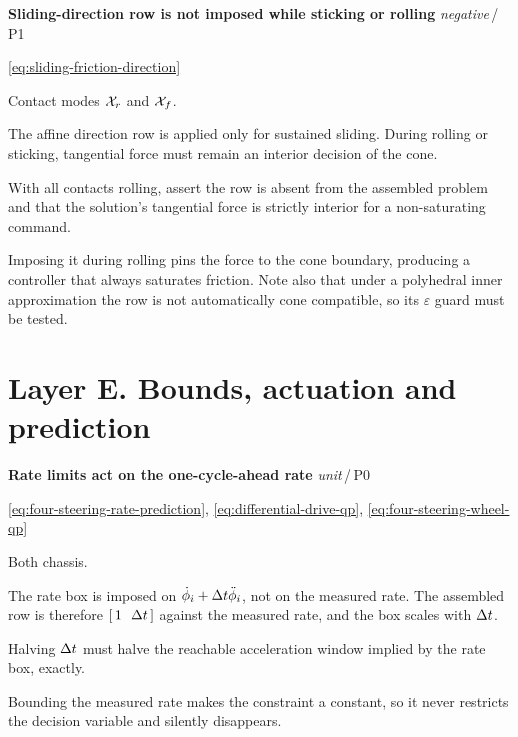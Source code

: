 \documentclass[10pt]{article}
\newcommand{\wheelAngle}{\phi}
\newenvironment{testcard}[4]{%
  \par\medskip\noindent
  \tBlock{#1}\quad\textbf{#2}%
  \hfill{\small\textit{#3}\,/\,#4}\par\nopagebreak\vspace{2pt}
  \begin{description}[leftmargin=7.5em,style=sameline,itemsep=1pt,topsep=1pt]
}{%
  \end{description}\par\medskip
}
\begin{document}
\begin{testcard}{FRI-10}{Sliding-direction row is not imposed while sticking or rolling}{negative}{P1}
  \item[Targets] \eqref{eq:sliding-friction-direction}
  \item[Regime] Contact modes $\mathcal{X}_{r}$ and $\mathcal{X}_{f}$.
  \item[Invariant] The affine direction row is applied only for sustained
    sliding. During rolling or sticking, tangential force must remain an
    interior decision of the cone.
  \item[Pass] With all contacts rolling, assert the row is absent from the
    assembled problem and that the solution's tangential force is strictly
    interior for a non-saturating command.
  \item[Diagnosis] Imposing it during rolling pins the force to the cone
    boundary, producing a controller that always saturates friction. Note also
    that under a polyhedral inner approximation the row is not automatically
    cone compatible, so its $\varepsilon$ guard must be tested.
\end{testcard}

\section{Layer E. Bounds, actuation and prediction}
\label{sec:test-layer-e}

\begin{testcard}{BND-01}{Rate limits act on the one-cycle-ahead rate}{unit}{P0}
  \item[Targets] \eqref{eq:four-steering-rate-prediction},
    \eqref{eq:differential-drive-qp}, \eqref{eq:four-steering-wheel-qp}
  \item[Regime] Both chassis.
  \item[Invariant] The rate box is imposed on
    $\dot{\wheelAngle}_i+\samplingPeriod\ddot{\wheelAngle}_i$, not on the
    measured rate. The assembled row is therefore $[\,1\ \ \Delta t\,]$
    against the measured rate, and the box scales with $\Delta t$.
  \item[Pass] Halving $\Delta t$ must halve the reachable acceleration
    window implied by the rate box, exactly.
  \item[Diagnosis] Bounding the measured rate makes the constraint a constant,
    so it never restricts the decision variable and silently disappears.
\end{testcard}
\end{document}

